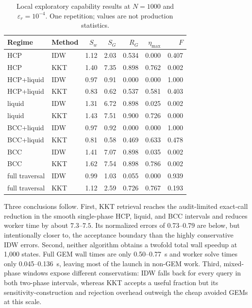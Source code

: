 \documentclass[11pt]{article}
\begin{document}
\begin{table}[htbp]
  \centering
  \caption{Local exploratory capability results at \(N=1000\) and
  \(\varepsilon_r=10^{-4}\).  One repetition; values are not production statistics.}
  \label{tab:local-capability}
  \small
  \begin{tabular}{llrrrrr}
    \toprule
    Regime & Method & \(S_w\) & \(S_G\) & \(R_G\) & \(\eta_{\max}\) & \(F\) \\
    \midrule
    HCP & IDW & 1.12 & 2.03 & 0.534 & 0.000 & 0.407 \\
    HCP & KKT & 1.40 & 7.35 & 0.898 & 0.762 & 0.002 \\
    HCP+liquid & IDW & 0.97 & 0.91 & 0.000 & 0.000 & 1.000 \\
    HCP+liquid & KKT & 0.83 & 0.62 & 0.537 & 0.581 & 0.403 \\
    liquid & IDW & 1.31 & 6.72 & 0.898 & 0.025 & 0.002 \\
    liquid & KKT & 1.43 & 7.51 & 0.900 & 0.726 & 0.000 \\
    BCC+liquid & IDW & 0.97 & 0.92 & 0.000 & 0.000 & 1.000 \\
    BCC+liquid & KKT & 0.81 & 0.58 & 0.469 & 0.633 & 0.478 \\
    BCC & IDW & 1.41 & 7.07 & 0.898 & 0.035 & 0.002 \\
    BCC & KKT & 1.62 & 7.54 & 0.898 & 0.786 & 0.002 \\
    full traversal & IDW & 0.99 & 1.03 & 0.055 & 0.000 & 0.939 \\
    full traversal & KKT & 1.12 & 2.59 & 0.726 & 0.767 & 0.193 \\
    \bottomrule
  \end{tabular}
\end{table}

Three conclusions follow.  First, KKT retrieval reaches the audit-limited exact-call reduction in
the smooth single-phase HCP, liquid, and BCC intervals and reduces worker time by about
\(7.3\)--\(7.5\).  Its normalized errors of 0.73--0.79 are below, but intentionally closer to, the
acceptance boundary than the highly conservative IDW errors.  Second, neither algorithm obtains a
twofold total wall speedup at 1,000 states.  Full GEM wall times are only 0.50--0.77~s and worker
solve times only 0.045--0.136~s, leaving most of the launch in non-GEM work.  Third, mixed-phase
windows expose different conservatism: IDW falls back for every query in both two-phase intervals,
whereas KKT accepts a useful fraction but its sensitivity-construction and rejection overhead
outweigh the cheap avoided GEMs at this scale.
\end{document}
